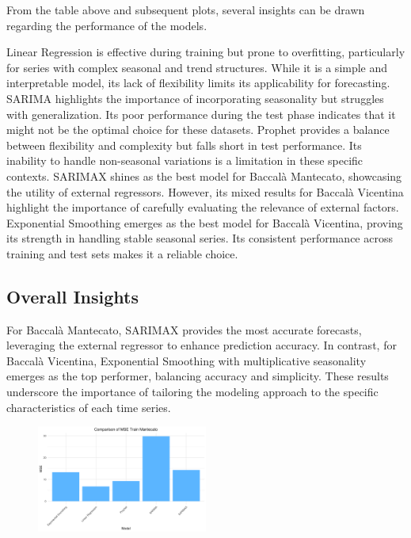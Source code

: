 \documentclass[10pt,twocolumn,letterpaper]{article}
\begin{document}
From the table above and subsequent plots, several insights can be drawn regarding the performance of the models.

Linear Regression is effective during training but prone to overfitting, particularly for series with complex seasonal and trend structures. While it is a simple and interpretable model, its lack of flexibility limits its applicability for forecasting. SARIMA highlights the importance of incorporating seasonality but struggles with generalization. Its poor performance during the test phase indicates that it might not be the optimal choice for these datasets. Prophet provides a balance between flexibility and complexity but falls short in test performance. Its inability to handle non-seasonal variations is a limitation in these specific contexts. SARIMAX shines as the best model for Baccalà Mantecato, showcasing the utility of external regressors. However, its mixed results for Baccalà Vicentina highlight the importance of carefully evaluating the relevance of external factors. Exponential Smoothing emerges as the best model for Baccalà Vicentina, proving its strength in handling stable seasonal series. Its consistent performance across training and test sets makes it a reliable choice.

\subsection*{Overall Insights}
For Baccalà Mantecato, SARIMAX provides the most accurate forecasts, leveraging the external regressor to enhance prediction accuracy. In contrast, for Baccalà Vicentina, Exponential Smoothing with multiplicative seasonality emerges as the top performer, balancing accuracy and simplicity. These results underscore the importance of tailoring the modeling approach to the specific characteristics of each time series.

\begin{figure}[H]
    \centering
    \includegraphics[width=0.5\textwidth]{PlotsBEFD/plot_results-1.png} 
    \caption{}
    \label{fig:esempio}
\end{figure}
\end{document}
